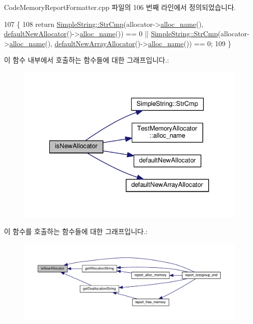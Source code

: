Code\+Memory\+Report\+Formatter.\+cpp 파일의 106 번째 라인에서 정의되었습니다.


\begin{DoxyCode}
107 \{
108     \textcolor{keywordflow}{return} \hyperlink{class_simple_string_a0b7a8ae895cbde84a491b42c43de23a6}{SimpleString::StrCmp}(allocator->\hyperlink{class_test_memory_allocator_afab6c44b5468c71a699c1efbd787e6e7}{alloc\_name}(), 
      \hyperlink{_test_memory_allocator_8h_a867eb2c996371985be8d9828339fd3d5}{defaultNewAllocator}()->\hyperlink{class_test_memory_allocator_afab6c44b5468c71a699c1efbd787e6e7}{alloc\_name}()) == 0 || 
      \hyperlink{class_simple_string_a0b7a8ae895cbde84a491b42c43de23a6}{SimpleString::StrCmp}(allocator->\hyperlink{class_test_memory_allocator_afab6c44b5468c71a699c1efbd787e6e7}{alloc\_name}(), 
      \hyperlink{_test_memory_allocator_8h_aec876a911821b794424b0f77a186f2ab}{defaultNewArrayAllocator}()->\hyperlink{class_test_memory_allocator_afab6c44b5468c71a699c1efbd787e6e7}{alloc\_name}()) == 0;
109 \}
\end{DoxyCode}


이 함수 내부에서 호출하는 함수들에 대한 그래프입니다.\+:
\nopagebreak
\begin{figure}[H]
\begin{center}
\leavevmode
\includegraphics[width=327pt]{class_code_memory_report_formatter_a33b96e0ded7b181daf75a9aab9a8f370_cgraph}
\end{center}
\end{figure}




이 함수를 호출하는 함수들에 대한 그래프입니다.\+:
\nopagebreak
\begin{figure}[H]
\begin{center}
\leavevmode
\includegraphics[width=350pt]{class_code_memory_report_formatter_a33b96e0ded7b181daf75a9aab9a8f370_icgraph}
\end{center}
\end{figure}


